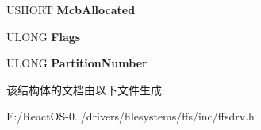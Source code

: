 \begin{DoxyCompactItemize}
\item 
\mbox{\label{struct___f_f_s___g_l_o_b_a_l_a15d1376ffa64db4eb1a5961d59961725}} 
U\+S\+H\+O\+RT {\bfseries Mcb\+Allocated}
\item 
\mbox{\label{struct___f_f_s___g_l_o_b_a_l_a152fed20dd3936f3c7d8750d6c2ec588}} 
U\+L\+O\+NG {\bfseries Flags}
\item 
\mbox{\label{struct___f_f_s___g_l_o_b_a_l_a6c1e803ae8d4c46aacaf59657b82b549}} 
U\+L\+O\+NG {\bfseries Partition\+Number}
\end{DoxyCompactItemize}


该结构体的文档由以下文件生成\+:\begin{DoxyCompactItemize}
\item 
E\+:/\+React\+O\+S-\/0../drivers/filesystems/ffs/inc/ffsdrv.\+h\end{DoxyCompactItemize}
